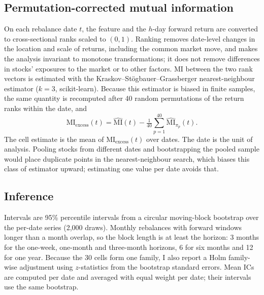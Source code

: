 \documentclass[11pt]{article}
\newcommand{\miex}{\mathrm{MI}_{\mathrm{excess}}}
\begin{document}
\subsection{Permutation-corrected mutual information}
On each rebalance date $t$, the feature and the $h$-day forward return are converted
to cross-sectional ranks scaled to $(0,1)$. Ranking removes date-level changes in the
location and scale of returns, including the common market move, and makes the
analysis invariant to monotone transformations; it does not remove differences in
stocks' exposures to the market or to other factors. MI between the two rank vectors
is estimated with the Kraskov--St\"ogbauer--Grassberger nearest-neighbour estimator
\citep{kraskov2004} ($k=3$, scikit-learn). Because this estimator is biased in finite
samples, the same quantity is recomputed after 40 random permutations of the return
ranks within the date, and
\[
\miex(t) = \widehat{\mathrm{MI}}(t) - \tfrac{1}{40}\textstyle\sum_{p=1}^{40}
\widehat{\mathrm{MI}}_{\pi_p}(t).
\]
The cell estimate is the mean of $\miex(t)$ over dates. The date is the unit of
analysis. Pooling stocks from different dates and bootstrapping the pooled sample
would place duplicate points in the nearest-neighbour search, which biases this class
of estimator upward; estimating one value per date avoids that.

\subsection{Inference}
Intervals are 95\% percentile intervals from a circular moving-block bootstrap
\citep{kunsch1989,politis1992} over the per-date series (2,000 draws). Monthly
rebalances with forward windows longer than a month overlap, so the block length is at
least the horizon: 3 months for the one-week, one-month and three-month horizons, 6 for
six months and 12 for one year. Because the 30 cells form one family, I also report a
Holm family-wise adjustment \citep{holm1979} using $z$-statistics from the bootstrap
standard errors. Mean ICs are computed per date and averaged with equal weight per
date; their intervals use the same bootstrap.
\end{document}
